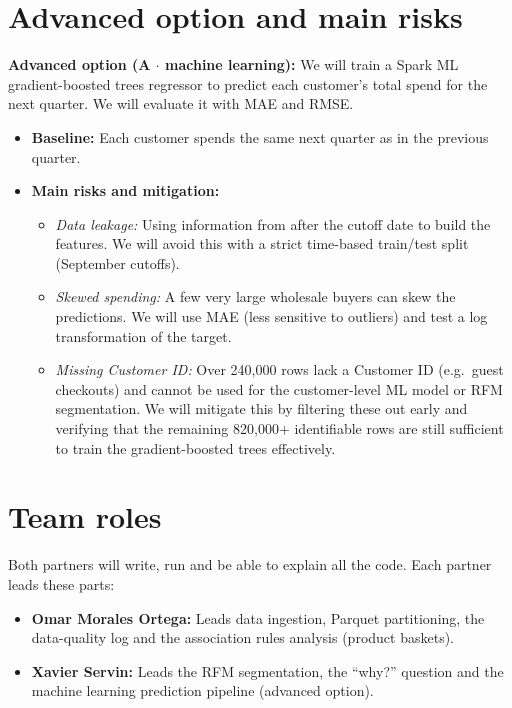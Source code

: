 \documentclass[11pt,a4paper]{article}
\begin{document}
\section{Advanced option and main risks}
\textbf{Advanced option (A $\cdot$ machine learning):} We will train a Spark ML gradient-boosted trees regressor to predict each customer's total spend for the next quarter. We will evaluate it with MAE and RMSE.
\begin{itemize}
  \item \textbf{Baseline:} Each customer spends the same next quarter as in the previous quarter.
  \item \textbf{Main risks and mitigation:}
  \begin{itemize}
    \item \emph{Data leakage:} Using information from after the cutoff date to build the features. We will avoid this with a strict time-based train/test split (September cutoffs).
    \item \emph{Skewed spending:} A few very large wholesale buyers can skew the predictions. We will use MAE (less sensitive to outliers) and test a log transformation of the target.
    \item \emph{Missing Customer ID:} Over 240,000 rows lack a Customer ID (e.g.\ guest checkouts) and cannot be used for the customer-level ML model or RFM segmentation. We will mitigate this by filtering these out early and verifying that the remaining 820,000+ identifiable rows are still sufficient to train the gradient-boosted trees effectively.
  \end{itemize}
\end{itemize}


\section{Team roles}
Both partners will write, run and be able to explain all the code. Each partner leads these parts:
\begin{itemize}
  \item \textbf{Omar Morales Ortega:} Leads data ingestion, Parquet partitioning, the data-quality log and the association rules analysis (product baskets).
  \item \textbf{Xavier Servin:} Leads the RFM segmentation, the ``why?'' question and the machine learning prediction pipeline (advanced option).
\end{itemize}
\end{document}
